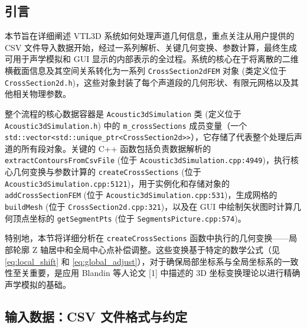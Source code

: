 \documentclass{ctexart}
\begin{document}
\subsection{引言}
本节旨在详细阐述 VTL3D 系统如何处理声道几何信息，重点关注从用户提供的 CSV 文件导入数据开始，经过一系列解析、关键几何变换、参数计算，最终生成可用于声学模拟和 GUI 显示的内部表示的全过程。系统的核心在于将离散的二维横截面信息及其空间关系转化为一系列 \texttt{CrossSection2dFEM} 对象 (类定义位于 \texttt{CrossSection2d.h})，这些对象封装了每个声道段的几何形状、有限元网格以及其他相关物理参数。

整个流程的核心数据容器是 \texttt{Acoustic3dSimulation} 类 (定义位于 \texttt{Acoustic3dSimulation.h}) 中的 \texttt{m\_crossSections} 成员变量（一个 \texttt{std::vector<std::unique\_ptr<CrossSection2d>>}），它存储了代表整个处理后声道的所有段对象。关键的 C++ 函数包括负责数据解析的 \texttt{extractContoursFromCsvFile} (位于 \texttt{Acoustic3dSimulation.cpp:4949})，执行核心几何变换与参数计算的 \texttt{createCrossSections} (位于 \texttt{Acoustic3dSimulation.cpp:5121})，用于实例化和存储对象的 \texttt{addCrossSectionFEM} (位于 \texttt{Acoustic3dSimulation.cpp:531})，生成网格的 \texttt{buildMesh} (位于 \texttt{CrossSection2d.cpp:321})，以及在 GUI 中绘制矢状图时计算几何顶点坐标的 \texttt{getSegmentPts} (位于 \texttt{SegmentsPicture.cpp:574})。

特别地，本节将详细分析在 \texttt{createCrossSections} 函数中执行的几何变换——局部轮廓 Z 轴居中和全局中心点补偿调整。这些变换基于特定的数学公式（见 \eqref{eq:local_shift} 和 \eqref{eq:global_adjust}），对于确保局部坐标系与全局坐标系的一致性至关重要，是应用 Blandin 等人论文 [1] 中描述的 3D 坐标变换理论以进行精确声学模拟的基础。

\subsection{输入数据：CSV 文件格式与约定}
\end{document}
